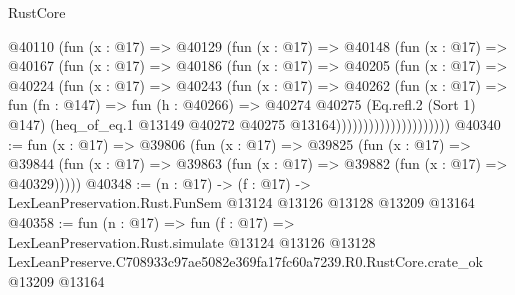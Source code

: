 \begin{lexlean}{RustCore}
\begin{coremodule}
                        @40110
                          (fun (x : @17) =>
                          @40129
                            (fun (x : @17) =>
                            @40148
                              (fun (x : @17) =>
                              @40167
                                (fun (x : @17) =>
                                @40186
                                  (fun (x : @17) =>
                                  @40205
                                    (fun (x : @17) =>
                                    @40224
                                      (fun (x : @17) =>
                                      @40243
                                        (fun (x : @17) =>
                                        @40262
                                          (fun (x : @17) =>
                                          fun (fn : @147) =>
                                          fun (h : @40266) =>
                                          @40274
                                            @40275
                                            (Eq.refl.{2} (Sort 1) @147)
                                            (heq_of_eq.{1}
                                              @13149
                                              @40272
                                              @40275
                                              @13164)))))))))))))))))))))
@40340 := fun (x : @17) =>
  @39806
    (fun (x : @17) =>
    @39825
      (fun (x : @17) =>
      @39844 (fun (x : @17) => @39863 (fun (x : @17) => @39882 (fun (x : @17) => @40329)))))
@40348 := (n : @17) ->
  (f : @17) -> LexLeanPreservation.Rust.FunSem @13124 @13126 @13128 @13209 @13164
@40358 := fun (n : @17) =>
  fun (f : @17) =>
  LexLeanPreservation.Rust.simulate
    @13124
    @13126
    @13128
    LexLeanPreserve.C708933c97ae5082e369fa17fc60a7239.R0.RustCore.crate_ok
    @13209
    @13164
\end{coremodule}
\end{lexlean}
